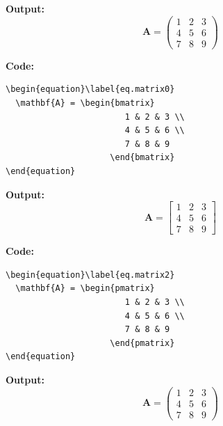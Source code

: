 \documentclass{book}
\newcommand{\myc}{\noindent\textbf{{\color{blue} Code}:}}
\newcommand{\myo}{\noindent\textbf{{\color{blue} Output}:\\}}
\begin{document}
\myo
\begin{equation}\label{eq.matrix1}
  \mathbf{A} = \left(\begin{array}{cc|c}
                        1 & 2 & 3 \\
                        4 & 5 & 6 \\
                        \hline
                        7 & 8 & 9
                     \end{array}
                     \right)
\end{equation}

\myc
\begin{lstlisting}
\begin{equation}\label{eq.matrix0}
  \mathbf{A} = \begin{bmatrix}
                        1 & 2 & 3 \\
                        4 & 5 & 6 \\
                        7 & 8 & 9
                     \end{bmatrix}
\end{equation}
\end{lstlisting}

\myo
\begin{equation}\label{eq.matrix0}
  \mathbf{A} = \begin{bmatrix}
                        1 & 2 & 3 \\
                        4 & 5 & 6 \\
                        7 & 8 & 9
                     \end{bmatrix}
\end{equation}

\myc
\begin{lstlisting}
\begin{equation}\label{eq.matrix2}
  \mathbf{A} = \begin{pmatrix}
                        1 & 2 & 3 \\
                        4 & 5 & 6 \\
                        7 & 8 & 9
                     \end{pmatrix}
\end{equation}
\end{lstlisting}

\myo
\begin{equation}\label{eq.matrix2}
  \mathbf{A} = \begin{pmatrix}
                        1 & 2 & 3 \\
                        4 & 5 & 6 \\
                        7 & 8 & 9
                     \end{pmatrix}
\end{equation}
\end{document}
